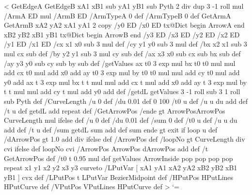 %
<{%
	GetEdgeA GetEdgeB
	xA1 xB1 sub yA1 yB1 sub
	Pyth 2 div dup 3 -1 roll mul
	/ArmA ED
	mul
	/ArmB ED
	/ArmTypeA 0 def
	/ArmTypeB 0 def
	GetArmA GetArmB
	xA2 yA2 xA1 yA1
	2 copy
	/y0 ED /x0 ED
	tx@Dict begin
		ArrowA
	end
	xB2 yB2 xB1 yB1
	tx@Dict begin
		ArrowB
	end
	/y3 ED /x3 ED /y2 ED /x2 ED /y1 ED /x1 ED
	/cx x1 x0 sub 3 mul def
	/cy y1 y0 sub 3 mul def
	/bx x2 x1 sub 3 mul cx sub def
	/by y2 y1 sub 3 mul cy sub def
	/ax x3 x0 sub cx sub bx sub def
	/ay y3 y0 sub cy sub by sub def
	/getValues {
		ax t0 3 exp mul bx t0 t0 mul mul add cx t0 mul add x0 add
		ay t0 3 exp mul by t0 t0 mul mul add cy t0 mul add y0 add
		ax t 3 exp mul bx t t mul mul add cx t mul add x0 add
	ay t 3 exp mul by t t mul mul add cy t mul add y0 add
	} def
	/getdL {
		getValues
		3 -1 roll sub 3 1 roll sub Pyth
	} def
	/CurveLength {
		/u 0 def
		/du 0.01 def
		0 100 {
			/t0 u def
			/u u du add def
			/t u def
			getdL add
		} repeat } def
	/GetArrowPos {
		/ende \psk@ArrowInsidePos{} gt {ArrowPos}{ArrowPos CurveLength mul} ifelse def
		/u 0 def
		/du 0.01 def
		/sum 0 def
		{
			/t0 u def
			/u u du add def
			/t u def
			/sum getdL sum add def
			sum ende gt {exit} if
		} loop u
	} def
	/dArrowPos  gt {%
		1.0  add div
	}{ \psk@ArrowInsidePos } ifelse def
	/ArrowPos \psk@ArrowInsideOffset\space def
	/loopNo \psk@ArrowInsidePos{} gt {%
		CurveLength \psk@ArrowInsidePos\space div cvi
		}{ \psk@ArrowInsideNo } ifelse def
	loopNo cvi {
		/ArrowPos ArrowPos dArrowPos add def
		/t GetArrowPos def
		/t0 t 0.95 mul def
		getValues
		ArrowInside pop pop pop pop
	} repeat
	x1 y1 x2 y2 x3 y3 curveto
	/LPutVar [ xA1 yA1 xA2 yA2 xB2 yB2 xB1 yB1 ] cvx def
	/LPutPos { t LPutVar BezierMidpoint } def
	/HPutPos { { HPutLines } HPutCurve } def
	/VPutPos { { VPutLines } HPutCurve } def
}>
%
\catcode`\@=\PstAtCode\relax
%
\endinput

